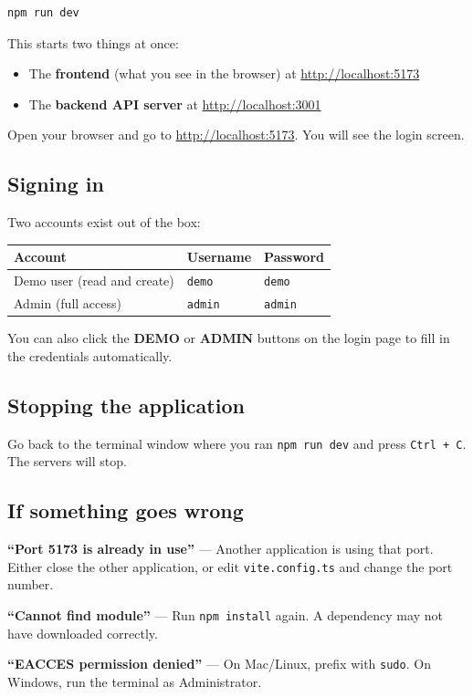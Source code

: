 \documentclass[12pt,a4paper]{article}
\begin{document}
\begin{lstlisting}
npm run dev
\end{lstlisting}

This starts two things at once:
\begin{itemize}
  \item The \textbf{frontend} (what you see in the browser) at \url{http://localhost:5173}
  \item The \textbf{backend API server} at \url{http://localhost:3001}
\end{itemize}

Open your browser and go to \url{http://localhost:5173}. You will see the login screen.

\subsection{Signing in}

Two accounts exist out of the box:

\begin{center}
\begin{tabular}{lll}
  \toprule
  \textbf{Account} & \textbf{Username} & \textbf{Password} \\
  \midrule
  Demo user (read and create) & \texttt{demo}  & \texttt{demo}  \\
  Admin (full access)         & \texttt{admin} & \texttt{admin} \\
  \bottomrule
\end{tabular}
\end{center}

You can also click the \textbf{DEMO} or \textbf{ADMIN} buttons on the login page to fill in the credentials automatically.

\subsection{Stopping the application}

Go back to the terminal window where you ran \texttt{npm run dev} and press \texttt{Ctrl + C}. The servers will stop.

\subsection{If something goes wrong}

\begin{warnbox}
\textbf{``Port 5173 is already in use''} — Another application is using that port. Either close the other application, or edit \texttt{vite.config.ts} and change the port number.

\textbf{``Cannot find module''} — Run \texttt{npm install} again. A dependency may not have downloaded correctly.

\textbf{``EACCES permission denied''} — On Mac/Linux, prefix with \texttt{sudo}. On Windows, run the terminal as Administrator.
\end{warnbox}
\end{document}
